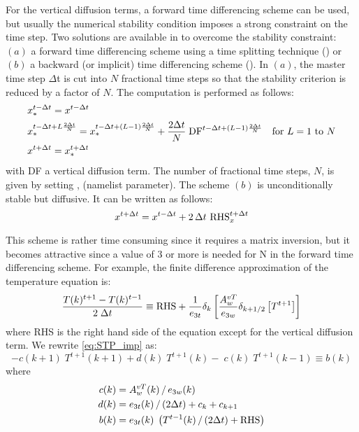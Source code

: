 \documentclass[../main/NEMO_manual]{subfiles}
\begin{document}
For the vertical diffusion terms, a forward time differencing scheme can be used,
but usually the numerical stability condition imposes a strong constraint on the time step.
Two solutions are available in \NEMO to overcome the stability constraint:
$(a)$ a forward time differencing scheme using a time splitting technique () or
$(b)$ a backward (or implicit) time differencing scheme                   ().
In $(a)$, the master time step $\Delta $t is cut into $N$ fractional time steps so that
the stability criterion is reduced by a factor of $N$.
The computation is performed as follows:
\[
  \begin{split}
    & x_\ast ^{t-\Delta t} = x^{t-\Delta t}   \\
    & x_\ast ^{t-\Delta t+L\frac{2\Delta t}{N}}=x_\ast ^{t-\Delta t+\left( {L-1}
      \right)\frac{2\Delta t}{N}}+\frac{2\Delta t}{N}\;\text{DF}^{t-\Delta t+\left( {L-1} \right)\frac{2\Delta t}{N}}
    \quad \text{for $L=1$ to $N$}      \\
    & x^{t+\Delta t} = x_\ast^{t+\Delta t}
  \end{split}
\]
with DF a vertical diffusion term.
The number of fractional time steps, $N$, is given by setting , (namelist parameter).
The scheme $(b)$ is unconditionally stable but diffusive. It can be written as follows:
\begin{equation}
  \label{eq:STP_imp}
  x^{t+\Delta t} = x^{t-\Delta t} + 2 \, \Delta t \  \text{RHS}_x^{t+\Delta t}
\end{equation} 


This scheme is rather time consuming since it requires a matrix inversion,
but it becomes attractive since a value of 3 or more is needed for N in the forward time differencing scheme.
For example, the finite difference approximation of the temperature equation is:
\[
  \frac{T(k)^{t+1}-T(k)^{t-1}}{2\;\Delta t}\equiv \text{RHS}+\frac{1}{e_{3t} }\delta
  _k \left[ {\frac{A_w^{vT} }{e_{3w} }\delta_{k+1/2} \left[ {T^{t+1}} \right]}
  \right]
\]
where RHS is the right hand side of the equation except for the vertical diffusion term.
We rewrite \autoref{eq:STP_imp} as:
\begin{equation}
  \label{eq:STP_imp_mat}
  -c(k+1)\;T^{t+1}(k+1) + d(k)\;T^{t+1}(k) - \;c(k)\;T^{t+1}(k-1) \equiv b(k)
\end{equation}
where 
\begin{align*}
  c(k) &= A_w^{vT} (k) \, / \, e_{3w} (k)     \\
  d(k) &= e_{3t} (k)       \, / \, (2\Delta t) + c_k + c_{k+1}    \\
  b(k) &= e_{3t} (k) \; \left( T^{t-1}(k) \, / \, (2\Delta t) + \text{RHS} \right)    
\end{align*}
\end{document}
